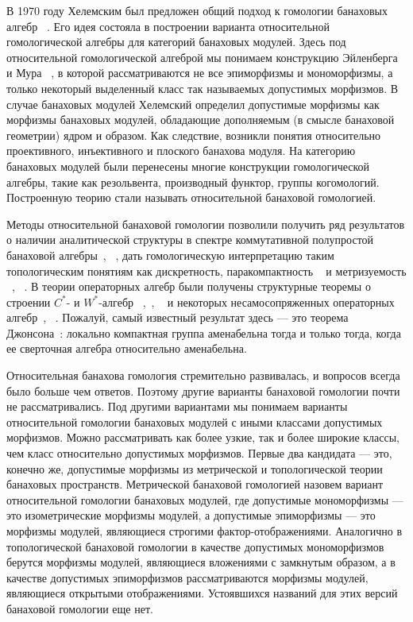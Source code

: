 В 1970 году Хелемским был предложен общий подход к гомологии банаховых алгебр
~\cite{HelemHomolDimNorModBanAlg}. Его идея состояла в построении варианта
относительной гомологической алгебры для категорий банаховых модулей. Здесь под
относительной гомологической алгеброй мы понимаем конструкцию Эйленберга и Мура
~\cite{EilenbergMooreFoundOfRelHomolAlg}, в которой рассматриваются не все
эпиморфизмы и мономорфизмы, а только некоторый выделенный класс так называемых
допустимых морфизмов. В случае банаховых модулей Хелемский определил допустимые
морфизмы как морфизмы банаховых модулей, обладающие дополняемым (в смысле
банаховой геометрии) ядром и образом. Как следствие, возникли понятия
относительно проективного, инъективного и плоского банахова модуля. На категорию
банаховых модулей были перенесены многие конструкции гомологической алгебры,
такие как резольвента, производный функтор, группы когомологий. Построенную
теорию стали называть относительной банаховой гомологией. 

Методы относительной банаховой гомологии позволили получить ряд результатов о
наличии аналитической структуры в спектре коммутативной полупростой банаховой
алгебры~\cite{PugachProjAndFlatIdealOfBanAlg},
~\cite{PugachHmolPropFuncAlgAndAnalytPolyDiscs}, дать гомологическую
интерпретацию таким топологическим понятиям как дискретность, паракомпактность
~\cite{HelemDescRelProjIdealCOmega} и метризуемость
~\cite{KurmakDependStrctHomolDimOfCOmegaOnOmega},
~\cite{SelivanovHomolDimOfCyclMod}. В теории операторных алгебр были получены
структурные теоремы о строении $C^*$- и $W^*$-алгебр
~\cite{HelemHomolEssenceConnAmen},~\cite{HelemProjHomolClassifOfCStarAlg},
~\cite{HelemWedderburnTypeThForOpAlgAndMod} и некоторых несамосопряженных
операторных алгебр~\cite{GolovibHomolPropHilbModOverNestOpAlg},
~\cite{GolovinSpatProjPropInClOfCSLAlg}. Пожалуй, самый известный результат
здесь --- это теорема Джонсона~\cite{JohnsonCohomolBanAlg}: локально компактная
группа аменабельна тогда и только тогда, когда ее сверточная алгебра
относительно аменабельна.

Относительная банахова гомология стремительно развивалась, и вопросов всегда
было больше чем ответов. Поэтому другие варианты банаховой гомологии почти не
рассматривались. Под другими вариантами мы понимаем варианты относительной
гомологии банаховых модулей с иными классами допустимых морфизмов. Можно
рассматривать как более узкие, так и более широкие классы, чем класс
относительно допустимых морфизмов. Первые два кандидата --- это, конечно же,
допустимые морфизмы из метрической и топологической теории банаховых
пространств. Метрической банаховой гомологией назовем вариант относительной
гомологии банаховых модулей, где допустимые мономорфизмы --- это изометрические
морфизмы модулей, а допустимые эпиморфизмы --- это морфизмы модулей, являющиеся
строгими фактор-отображениями. Аналогично в топологической банаховой гомологии в
качестве допустимых мономорфизмов берутся морфизмы модулей, являющиеся
вложениями с замкнутым образом, а в качестве допустимых эпиморфизмов
рассматриваются морфизмы модулей, являющиеся открытыми отображениями.
Устоявшихся названий для этих версий банаховой гомологии еще нет.

